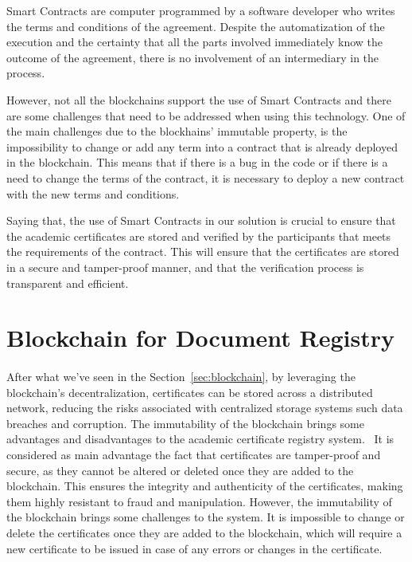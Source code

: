 Smart Contracts are computer programmed by a software developer who writes the terms and conditions of the agreement. Despite the automatization of the execution and the certainty that all the parts
involved immediately know the outcome of the agreement, there is no involvement of an intermediary in the process.

However, not all the blockchains support the use of Smart Contracts and there are some challenges that need to be addressed when using this technology.
One of the main challenges due to the blockhains' immutable property, is the impossibility to change or add any term into a contract that is already deployed in the blockchain.
This means that if there is a bug in the code or if there is a need to change the terms of the contract, it is necessary to deploy a new contract with the new terms and conditions.

Saying that, the use of Smart Contracts in our solution is crucial to ensure that the academic certificates are stored and verified by the participants that meets the requirements of the contract.
This will ensure that the certificates are stored in a secure and tamper-proof manner, and that the verification process is transparent and efficient.

\section{Blockchain for Document Registry}\label{sec:blockchain-academic-certificate-registry}
\paragraph{}

After what we've seen in the Section~\ref{sec:blockchain}, by leveraging the blockchain's decentralization, certificates can be stored across a distributed network,
reducing the risks associated with centralized storage systems such data breaches and corruption.
The immutability of the blockchain brings some advantages and disadvantages to the academic certificate registry system.~\cite{nzuva2019smart}
It is considered as main advantage the fact that certificates are tamper-proof and secure, as they cannot be altered or deleted once they are added to the blockchain. This ensures the
integrity and authenticity of the certificates, making them highly resistant to fraud and manipulation.
However, the immutability of the blockchain brings some challenges to the system. It is impossible to change or delete the certificates once they are added to the blockchain, which will
require a new certificate to be issued in case of any errors or changes in the certificate.

